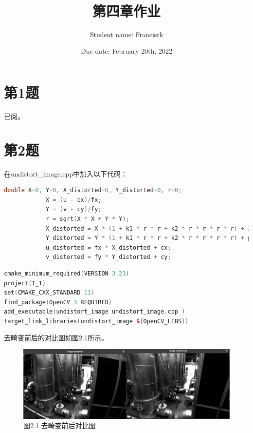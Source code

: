 \documentclass[40pt,a4paper，UTF8]{ctexart}
\title{第四章作业}
\author{Student name: Francisrk}
\date{Due date: February 20th, 2022}
\numberwithin{equation}{section}
\begin{document}
\maketitle   %

\section{第1题}
\paragraph{}
已阅。
\paragraph{}


\section{第2题}
\paragraph{}

在undistort\_image.cpp中加入以下代码：
\begin{lstlisting}[language=C++, caption=在undistort\_image.cpp]
            double X=0, Y=0, X_distorted=0, Y_distorted=0, r=0;
            X = (u - cx)/fx;
            Y = (v - cy)/fy;
            r = sqrt(X * X + Y * Y);
            X_distorted = X * (1 + k1 * r * r + k2 * r * r * r * r) + 2 * p1 * X * Y + p2 * (r * r + 2 * X * X);
            Y_distorted = Y * (1 + k1 * r * r + k2 * r * r * r * r) + p1 * (r * r + 2 * Y * Y) + 2 * p2 * X * Y;
            u_distorted = fx * X_distorted + cx;
            v_distorted = fy * Y_distorted + cy;
\end{lstlisting}

\begin{lstlisting}[language=C++, caption=工程/CMakeLists.txt]
cmake_minimum_required(VERSION 3.21)
project(T_1)
set(CMAKE_CXX_STANDARD 11)
find_package(OpenCV 3 REQUIRED)
add_executable(undistort_image undistort_image.cpp )
target_link_libraries(undistort_image ${OpenCV_LIBS})
\end{lstlisting}

去畸变前后的对比图如图2.1所示。
\begin{figure}[H]
\centering
\includegraphics[width=4.8in]{ch4_2_1.png} {图2.1 去畸变前后对比图}
\end{figure}
\end{document}
